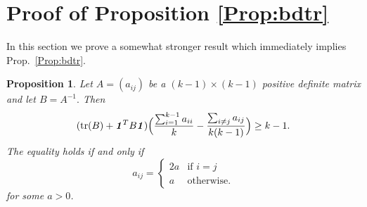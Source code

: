\documentclass[11pt,onecolumn]{IEEEtran}
\newtheorem{proposition}[theorem]{Proposition}
\def\mathbi#1{{\textbf{\textit #1}}}
\DeclareMathOperator{\tr}{tr}
\begin{document}
\section{Proof of Proposition \ref{Prop:bdtr}}\label{ap:bdtr}
In this section we prove a somewhat stronger result which immediately implies Prop.~\ref{Prop:bdtr}.
\begin{proposition}\label{Prop:Zac}
Let $A=(a_{ij})$ be a $(k-1)\times (k-1)$ positive definite matrix and let $B=A^{-1}.$
Then
\begin{equation}\label{eq:obj}
( \tr(B) + \mathbi{1}^T B \mathbi{1} ) 
\Big( \frac{\sum_{i=1}^{k-1}a_{ii}}{k}-\frac{\sum_{i\neq j}a_{ij} }{k(k-1)} \Big) \ge k-1.
\end{equation}
The equality holds if and only if 
\begin{equation}\label{eq:eqcon}
a_{ij}=\begin{cases} 2a &\text{if } i=j\\
a&\text{otherwise}.
\end{cases}
\end{equation} 
for some $a>0$.
\end{proposition}
\end{document}
